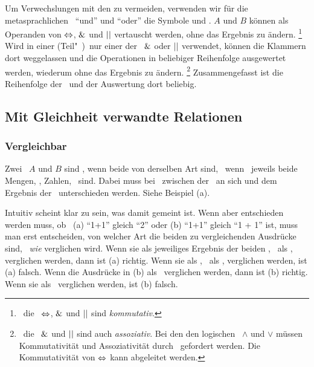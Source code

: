 Um Verwechslungen mit den \Junktoren zu vermeiden, verwenden wir für die metasprachlichen \Operatoren\ \enquote{und} und \enquote{oder} die Symbole \chrqt{$\metaandsym$} und \chrqt{$\metaorsym$}.
$A$ und $B$ können als Operanden von $\Leftrightarrow$, $\metaandsym$ und $\metaorsym$ vertauscht werden, ohne das Ergebnis zu ändern.%
\footnote{%
	\textDh\ die \Operatoren\ $\Leftrightarrow$, $\metaandsym$ und $\metaorsym$ sind \emph{kommutativ}.
}
Wird in einer (Teil"~)\Aussage\ nur einer der \Operatoren\ $\metaandsym$ oder $\metaorsym$ verwendet, können die Klammern dort weggelassen und die Operationen in beliebiger Reihenfolge ausgewertet werden, wiederum ohne das Ergebnis zu ändern.%
\footnote{%
	\textDh\ die \Operatoren\ $\metaandsym$ und $\metaorsym$ sind auch \emph{assoziativ}.
	Bei den den logischen \Operatoren\ $\land$ und $\lor$ müssen Kommutativität und Assoziativität durch \Axiome\ gefordert werden.
	Die Kommutativität von $\Leftrightarrow$ kann abgeleitet werden.
}
Zusammengefasst ist die Reihenfolge der \Operatoren\ und der Auswertung dort beliebig.

\subsection{Mit Gleichheit verwandte Relationen}%
\label{sub:Gleichheit}

\subsubsection{Vergleichbar}%
\label{subsub:Vergleichbar}

Zwei \Objekte\ $A$ und $B$ sind , wenn beide von derselben Art sind, \textdh\ wenn \textzB\ jeweils beide Mengen, \Zeichenfolgen, Zahlen, \textusw\ sind.
Dabei muss bei \Formeln\ zwischen der \Formel\ an sich und dem Ergebnis der \Formel\ unterschieden werden. Siehe Beispiel (a).

Intuitiv scheint klar zu sein, was damit  gemeint ist.
Wenn aber entschieden werden muss, ob \textzB\ (a) \enquote{1+1} gleich \enquote{2} oder (b) \enquote{1+1} gleich \enquote{1 + 1} ist, muss man erst entscheiden, von welcher Art die beiden zu vergleichenden Ausdrücke sind, \textdh\ \emph{wie} verglichen wird.
Wenn sie als jeweiliges Ergebnis der beiden \Formeln, \textdh\ als \Objekt, verglichen werden, dann ist (a) richtig.
Wenn sie als \Formeln, \textdh\ als \Zeichenfolgen, verglichen werden, ist (a) falsch.
Wenn die Ausdrücke in (b) als \Zeichenfolgen\ verglichen werden, dann ist (b) richtig.
Wenn sie als \Zeichenketten\ verglichen werden, ist (b) falsch.

